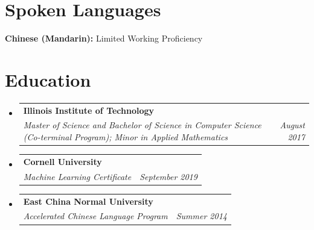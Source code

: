 \documentclass[letterpaper,10pt]{article}
\makeatletter
\newcommand{\resumeSubheading}[4]{
  \vspace{-1pt}\item
    \begin{tabular*}{0.97\textwidth}[t]{l@{\extracolsep{\fill}}r}
      \textbf{#1} & #2 \\
      \textit{\small#3} & \textit{\small #4} \\
    \end{tabular*}\vspace{-4pt}
}
\newcommand{\resumeSubHeadingListStart}{\begin{itemize}[leftmargin=0.15in, label={}]}
\newcommand{\resumeSubHeadingListEnd}{\end{itemize}}
\makeatother
\begin{document}
\section{Spoken Languages}
 \begin{itemize}[leftmargin=0.15in, label={}]
    \small{\item{
     \textbf{Chinese (Mandarin):} Limited Working Proficiency
    }}
 \end{itemize}

\section{Education}
  \resumeSubHeadingListStart
    \resumeSubheading
      {Illinois Institute of Technology}{}
      {Master of Science and Bachelor of Science in Computer Science (Co-terminal Program); Minor in Applied Mathematics}{August 2017}
    \resumeSubheading
      {Cornell University}{}
      {Machine Learning Certificate}{September 2019}
    \resumeSubheading
      {East China Normal University}{}
      {Accelerated Chinese Language Program}{Summer 2014}
  \resumeSubHeadingListEnd

\end{document}
